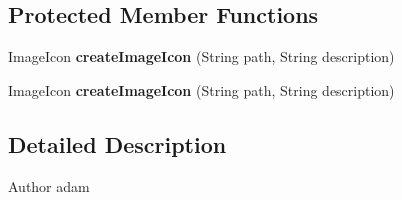 \subsection*{Protected Member Functions}
\begin{DoxyCompactItemize}
\item 
\hypertarget{classCASUAL_1_1CASUALJFrame_a980c3bf8b6a3d1c65f9ca5ecac0220b9}{Image\-Icon {\bfseries create\-Image\-Icon} (String path, String description)}\label{classCASUAL_1_1CASUALJFrame_a980c3bf8b6a3d1c65f9ca5ecac0220b9}

\item 
\hypertarget{classCASUAL_1_1CASUALJFrame_a980c3bf8b6a3d1c65f9ca5ecac0220b9}{Image\-Icon {\bfseries create\-Image\-Icon} (String path, String description)}\label{classCASUAL_1_1CASUALJFrame_a980c3bf8b6a3d1c65f9ca5ecac0220b9}

\end{DoxyCompactItemize}


\subsection{Detailed Description}
\begin{DoxyAuthor}{Author}
adam 
\end{DoxyAuthor}


